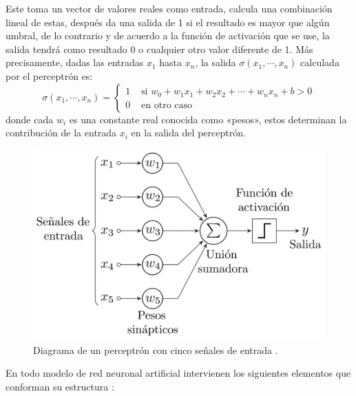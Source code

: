 \documentclass[12pt,letterpaper,oneside,openright]{book}
\begin{document}
	Este toma un vector de valores reales como entrada, calcula una combinación lineal de estas, después da una salida de 1 si el resultado es mayor que algún umbral, de lo contrario y de acuerdo a la función de activación que se use, la salida tendrá como resultado 0 o cualquier otro valor diferente de 1. Más precisamente, dadas las entradas $x_1$ hasta $x_n$, la salida $\sigma(x_1,\dotsb,x_n)$ calculada por el perceptrón es: 
	\begin{equation}
		\label{eq:percept}
		\sigma(x_1,\dotsb,x_n) = \left\{\begin{array}{lll}
			1 & \text { si } w_0 + w_1x_1 + w_2x_2 + \dotsb + w_nx_n + b > 0 \\
			0 & \text { en otro caso } 
		\end{array}\right.
	\end{equation}
	donde cada $w_i$ es una constante real conocida como «pesos», estos determinan la contribución de la entrada $x_i$ en la salida del perceptrón.
	\begin{figure}[h]
		\centering
		\includegraphics[width=0.8\linewidth]{Sem_1/figuras/Perceptron}
		\caption{Diagrama de un perceptrón con cinco señales de entrada \cite{imaPercep}.}
		\label{fig:diagrama_perceptron}
	\end{figure}
	En todo modelo de red neuronal artificial intervienen los siguientes elementos que conforman su estructura \cite{monsSistem}: 
\end{document}
